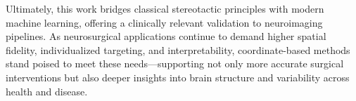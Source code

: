 Ultimately, this work bridges classical stereotactic principles with modern machine learning, offering a clinically relevant validation to neuroimaging pipelines. As neurosurgical applications continue to demand higher spatial fidelity, individualized targeting, and interpretability, coordinate-based methods stand poised to meet these needs—supporting not only more accurate surgical interventions but also deeper insights into brain structure and variability across health and disease.
